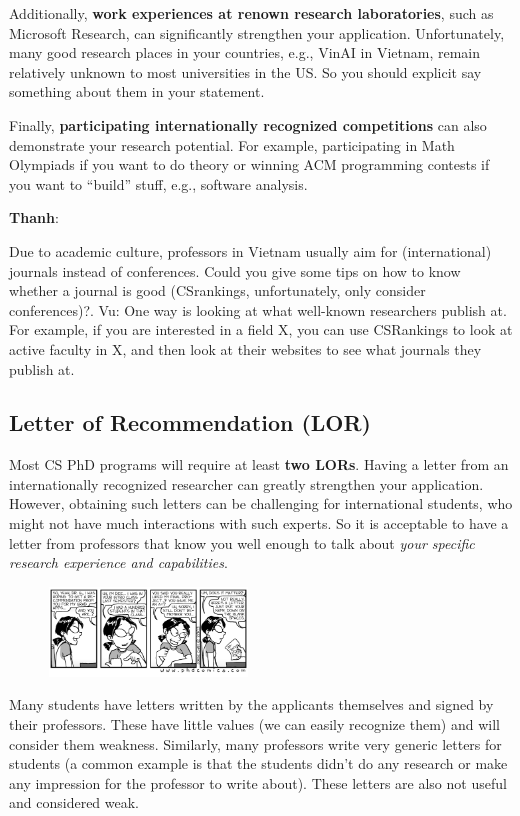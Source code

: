 \documentclass[11pt]{article}
\newenvironment{commentbox}[1][]{
\small
    \begin{cbox}
    \textbf{#1}: 
 }{
   \end{cbox}
}
\begin{document}
Additionally, \textbf{work experiences at renown research laboratories}, such as Microsoft Research, can significantly strengthen your
application.  Unfortunately, many good research places in your countries, e.g., VinAI in Vietnam, remain relatively unknown to most universities in the US. So you should explicit say something about them in your statement.

Finally, \textbf{participating internationally recognized competitions} can also demonstrate your research potential.
For example, participating in Math Olympiads if you want to do theory or  winning ACM programming contests if you want to ``build'' stuff, e.g., software analysis.

\begin{commentbox}[Thanh]
Due to academic culture, professors in Vietnam usually aim for (international) journals instead of conferences. Could you give some tips on how to know whether a journal is good (CSrankings, unfortunately, only consider conferences)?.
\tcblower
Vu: One way is looking at what well-known researchers publish at. For example, if you are interested in a field X, you can use CSRankings to look at active faculty in X, and then look at their websites to see what journals they publish at.
\end{commentbox}

\subsection{Letter of Recommendation (LOR)}\label{sec:lor}

Most CS PhD programs will require at least \textbf{two LORs}. Having a letter from an internationally recognized researcher can greatly strengthen your application. However, obtaining such letters
can be challenging for international students, who might not have much interactions with such experts. So it is acceptable to have a letter from professors that know you well enough to talk about \emph{your specific research experience and capabilities}.

\begin{figure}
    \vspace{-0.35in}
      \begin{center}
        \includegraphics[width=0.47\textwidth]{c6.png}
      \end{center}
    \vspace{-0.4in}
    \end{figure}
Many students have letters written by the applicants themselves and signed by their professors. These have little
values (we can easily recognize them) and will consider them weakness.
Similarly, many professors write very generic letters for students (a common example is that the students didn't do any
research or make any impression for the professor to write about). These letters are also not useful and considered weak.
\end{document}
